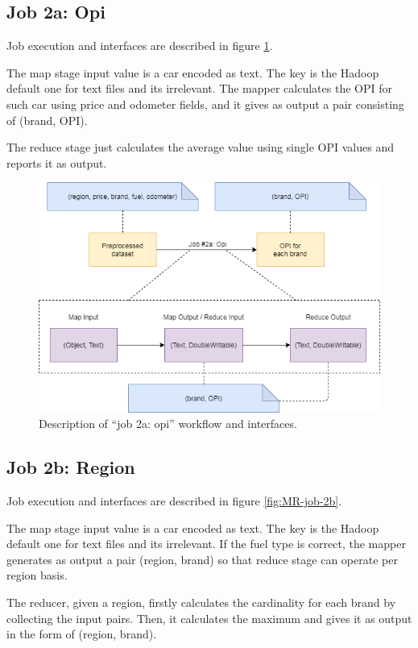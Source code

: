 \subsection{Job 2a: Opi}

Job execution and interfaces are described in figure \ref{fig:MR-job-2a}.

The map stage input value is a car encoded as text. The key is the Hadoop default one for text files and its irrelevant. The mapper calculates the OPI for such car using price and odometer fields, and it gives as output a pair consisting of (brand, OPI).

The reduce stage just calculates the average value using single OPI values and reports it as output.
   
\begin{figure}[H]
	\centering
	\includegraphics[scale=0.7]{images/2-mapreduce/MR-job-2a.png}
	\caption{Description of ``job 2a: opi'' workflow and interfaces.}
	\label{fig:MR-job-2a}
\end{figure}  

\subsection{Job 2b: Region}

Job execution and interfaces are described in figure \ref{fig:MR-job-2b}.

The map stage input value is a car encoded as text. The key is the Hadoop default one for text files and its irrelevant. If the fuel type is correct, the mapper generates as output a pair (region, brand) so that reduce stage can operate per region basis.

The reducer, given a region, firstly calculates the cardinality for each brand by collecting the input pairs. Then, it calculates the maximum and gives it as output in the form of (region, brand).

